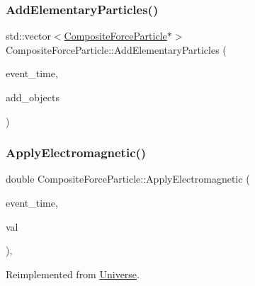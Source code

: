 \subsubsection{\texorpdfstring{Add\+Elementary\+Particles()}{AddElementaryParticles()}}
{\footnotesize\ttfamily std\+::vector$<$\mbox{\hyperlink{classCompositeForceParticle}{Composite\+Force\+Particle}}$\ast$$>$ Composite\+Force\+Particle\+::\+Add\+Elementary\+Particles (\begin{DoxyParamCaption}\item[{std\+::chrono\+::time\+\_\+point$<$ \mbox{\hyperlink{universe_8h_a0ef8d951d1ca5ab3cfaf7ab4c7a6fd80}{Clock}} $>$}]{event\+\_\+time,  }\item[{std\+::vector$<$ \mbox{\hyperlink{classCompositeForceParticle}{Composite\+Force\+Particle}} $\ast$$>$}]{add\+\_\+objects }\end{DoxyParamCaption})}

\mbox{\label{classCompositeForceParticle_afa4dc18258722b3c85fbc9789a4297a5}} 
\subsubsection{\texorpdfstring{Apply\+Electromagnetic()}{ApplyElectromagnetic()}}
{\footnotesize\ttfamily double Composite\+Force\+Particle\+::\+Apply\+Electromagnetic (\begin{DoxyParamCaption}\item[{std\+::chrono\+::time\+\_\+point$<$ \mbox{\hyperlink{universe_8h_a0ef8d951d1ca5ab3cfaf7ab4c7a6fd80}{Clock}} $>$}]{event\+\_\+time,  }\item[{double}]{val }\end{DoxyParamCaption})\hspace{0.3cm}{\ttfamily [inline]}, {\ttfamily [virtual]}}



Reimplemented from \mbox{\hyperlink{classUniverse_a1f787da78fa196ba635db21a9e91dabb}{Universe}}.

\mbox{\label{classCompositeForceParticle_a5f6aef9e15e2e5f346c7ede76ae6458b}} 
